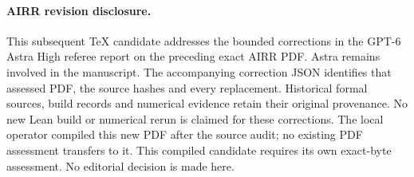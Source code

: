 \documentclass[11pt]{article}
\theoremstyle{definition}
\begin{document}
\paragraph{AIRR revision disclosure.}
This subsequent TeX candidate addresses the bounded corrections in the
GPT-6 Astra High referee report on the preceding exact AIRR PDF.
Astra remains involved in the manuscript. The accompanying correction
JSON identifies that assessed PDF, the source hashes and every replacement.
Historical formal sources, build records and numerical evidence retain
their original provenance. No new Lean build or numerical rerun is claimed
for these corrections. The local operator compiled this new PDF after the source audit;
no existing PDF assessment transfers to it. This compiled candidate
requires its own exact-byte assessment. No editorial decision is made here.
\end{document}

